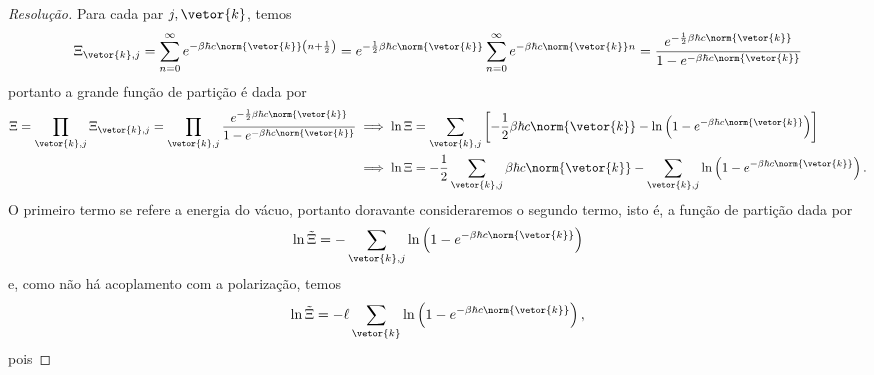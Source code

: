 \begin{proof}[Resolução]
    Para cada par \(j, \vetor{k}\), temos
    \begin{equation*}
        \Xi_{\vetor{k},j} = \sum_{n = 0}^\infty e^{-\beta \hbar c \norm{\vetor{k}} \left(n + \frac12\right)} = e^{-\frac12\beta \hbar c \norm{\vetor{k}}} \sum_{n=0}^\infty e^{- \beta \hbar c \norm{\vetor{k}} n} = \frac{e^{-\frac12 \beta \hbar c \norm{\vetor{k}}}}{1 - e^{-\beta\hbar c \norm{\vetor{k}}}}
    \end{equation*}
    portanto a grande função de partição é dada por
    \begin{align*}
        \Xi = \prod_{\vetor{k},j} \Xi_{\vetor{k},j} = \prod_{\vetor{k},j} \frac{e^{-\frac12 \beta \hbar c \norm{\vetor{k}}}}{1 - e^{-\beta \hbar c \norm{\vetor{k}}}}
        &\implies \ln \Xi = \sum_{\vetor{k}, j} \left[-\frac12 \beta \hbar c \norm{\vetor{k}} - \ln\left(1 - e^{- \beta \hbar c \norm{\vetor{k}}}\right)\right]\\
        &\implies \ln \Xi = -\frac12\sum_{\vetor{k}, j} \beta \hbar c \norm{\vetor{k}} - \sum_{\vetor{k},j} \ln\left(1 - e^{- \beta \hbar c \norm{\vetor{k}}}\right).
    \end{align*}
    O primeiro termo se refere a energia do vácuo, portanto doravante consideraremos o segundo termo, isto é, a função de partição dada por
    \begin{equation*}
        \ln \tilde{\Xi} = - \sum_{\vetor{k}, j} \ln\left(1 - e^{-\beta \hbar c \norm{\vetor{k}}}\right)
    \end{equation*}
    e, como não há acoplamento com a polarização, temos
    \begin{equation*}
        \ln \tilde\Xi = -\ell \sum_{\vetor{k}} \ln\left(1 - e^{- \beta \hbar c \norm{\vetor{k}}}\right),
    \end{equation*}
    pois 


\end{proof}
